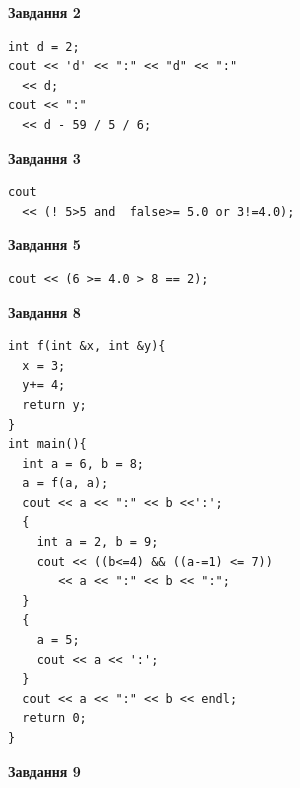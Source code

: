 \documentclass[12pt, ukrainian]{article}
\begin{document}
{\begin {large}
\begin{minipage}[t]{7.0cm}
\end{minipage}
\vline \hspace{1mm}
\begin{minipage}[t]{11.0cm}

\begin{center}
\textbf{Завдання 2}
\end{center}
\vspace{-8mm}

\begin{verbatim}
int d = 2;
cout << 'd' << ":" << "d" << ":" 
  << d;
cout << ":" 
  << d - 59 / 5 / 6;
\end{verbatim}



\begin{center}
\textbf{Завдання 3}
\end{center}
\vspace{-8mm}

\begin{verbatim}
cout 
  << (! 5>5 and  false>= 5.0 or 3!=4.0);
\end{verbatim}



\begin{center}
\textbf{Завдання 5}
\end{center}
\vspace{-8mm}

\begin{verbatim}
cout << (6 >= 4.0 > 8 == 2);
\end{verbatim}



\begin{center}
\textbf{Завдання 8}
\end{center}
\vspace{-8mm}

\begin{verbatim}
int f(int &x, int &y){
  x = 3;
  y+= 4;
  return y;
}
int main(){
  int a = 6, b = 8;
  a = f(a, a);
  cout << a << ":" << b <<':';
  {
    int a = 2, b = 9;
    cout << ((b<=4) && ((a-=1) <= 7))
       << a << ":" << b << ":";
  }
  {
    a = 5;
    cout << a << ':';
  }
  cout << a << ":" << b << endl;
  return 0;
}
\end{verbatim}

\end{minipage}


\begin{minipage}[t]{7.0cm}

\begin{center}
\textbf{Завдання 9}
\end{center}
\vspace{-8mm}


\end{minipage}
\end{large}}
\end{document}
